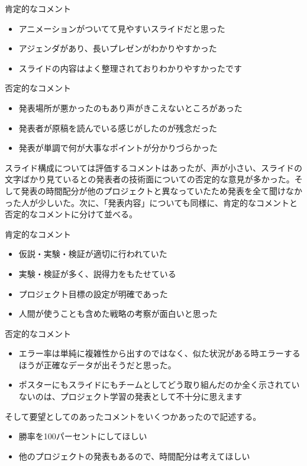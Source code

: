 肯定的なコメント
\begin{itemize}
\item アニメーションがついてて見やすいスライドだと思った
\item アジェンダがあり、長いプレゼンがわかりやすかった
\item スライドの内容はよく整理されておりわかりやすかったです
\end{itemize}

否定的なコメント
\begin{itemize}
\item 発表場所が悪かったのもあり声がきこえないところがあった
\item 発表者が原稿を読んでいる感じがしたのが残念だった
\item 発表が単調で何が大事なポイントが分かりづらかった
\end{itemize}

スライド構成については評価するコメントはあったが、声が小さい、スライドの文字ばかり見ているとの発表者の技術面についての否定的な意見が多かった。そして発表の時間配分が他のプロジェクトと異なっていたため発表を全て聞けなかった人が少しいた。次に、「発表内容」についても同様に、肯定的なコメントと否定的なコメントに分けて並べる。

肯定的なコメント
\begin{itemize}
\item 仮説・実験・検証が適切に行われていた
\item 実験・検証が多く、説得力をもたせている
\item プロジェクト目標の設定が明確であった
\item 人間が使うことも含めた戦略の考察が面白いと思った
\end{itemize}

否定的なコメント
\begin{itemize}
\item エラー率は単純に複雑性から出すのではなく、似た状況がある時エラーするほうが正確なデータが出そうだと思った。
\item ポスターにもスライドにもチームとしてどう取り組んだのか全く示されていないのは、プロジェクト学習の発表として不十分に思えます
\end{itemize}

そして要望としてのあったコメントをいくつかあったので記述する。
\begin{itemize}
\item 勝率を100パーセントにしてほしい
\item 他のプロジェクトの発表もあるので、時間配分は考えてほしい
\end{itemize}

